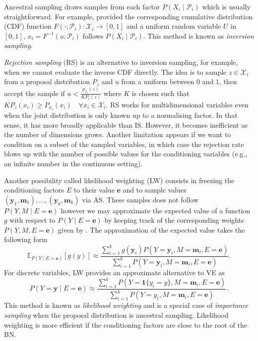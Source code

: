 Ancestral sampling draws samples from each factor $P(X_i\mid \mathcal{P}_i)$ which is usually straightforward. For example, provided the corresponding cumulative distribution (CDF) function $F(\cdot;\mathcal{P}_i): \mathcal{X}_i \rightarrow \left[0, 1 \right]$ and a uniform random variable $U$ in $\left[0, 1\right]$, $x_i=F^{-1}(u;\mathcal{P}_i)$ follows $P(X_i\mid \mathcal{P}_i)$. This method is known as \textit{inversion sampling}.

\textit{Rejection sampling} (RS) is an alternative to inversion sampling, for example, when we cannot evaluate the inverse CDF directly. The idea is to sample $z \in \mathcal{X}_i$ from a proposal distribution $P_z$ and $u$ from a uniform between $0$ and $1$, then accept the sample if $u< \frac{p_{x_i}(z)}{K P_z(z)} $ where $K$ is chosen such that $ K P_z(x_i) \geq P_{x_i}(x_i) \quad \forall x_i \in \mathcal{X}_i$. RS works for multidimensional variables even when the joint distribution is only known up to a normalising factor. In that sense, it has more broadly applicable than IS. However, it becomes inefficient as the number of dimensions grows. Another limitation appears if we want to condition on a subset of the sampled variables, in which case the rejection rate blows up with the number of possible values for the conditioning variables (e.g., an infinite number in the continuous setting).

 Another possibility called likelihood weighting (LW) consists in freezing the conditioning factors $E$ to their value $\bm{e}$ and to sample values $(\bm{y}_1, \bm{m}_1), \dots, (\bm{y}_k, \bm{m}_k)$ via AS. These samples does not follow $P(Y, M\mid E=\bm{e})$ however we may approximate the expected value of a function $g$ with respect to $P(Y\mid E=\bm{e})$ by keeping track of the corresponding weights $P(Y, M, E=\bm{e})$ given by . The approximation of the expected value takes the following form
$$ \mathbb{E}_{P(Y\mid E=\bm{e})}\left[g(y)\right] \approx \frac{\sum_{i=1}^k g(\bm{y}_i) P(Y=\bm{y}_i, M=\bm{m}_i, E=\bm{e})}{\sum_{i=1}^k P(Y=\bm{y}_i, M=\bm{m}_i, E=\bm{e}) }.$$ For discrete variables, LW provides an approximate alternative to VE as
 $$P(Y=\bm{y}\mid E=\bm{e}) \approx \frac{\sum_{i=1}^k P(Y=\bm{1}\{y_i = y\}, M=\bm{m}_i, E=\bm{e})}{\sum_{i=1}^k P(Y=y_i, M=\bm{m}_i, E=\bm{e})}. $$
 This method is known as \textit{likelihood weighting} and is a special case of \textit{importance sampling} when the proposal distribution is ancestral sampling. Likelihood weighting is more efficient if the conditioning factors are close to the root of the BN.

